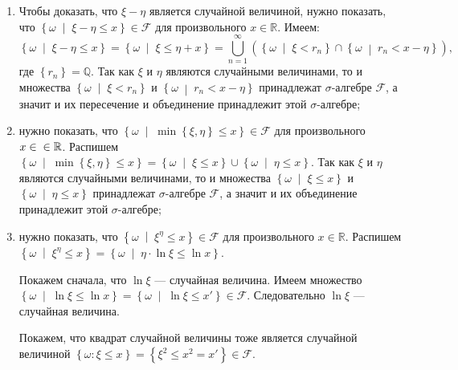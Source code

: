 \begin{enumerate}[label=\alph*)]
\item
Чтобы доказать, что $ \xi - \eta $ является случайной величиной,
нужно показать, что $ \left\{ \omega \; \middle| \; \xi - \eta \leq x \right\} \in \mathcal{F} $ для произвольного $x \in \mathbb{R} $.
Имеем:
$$ \left\{ \omega \; \middle| \; \xi - \eta \leq x \right\} =
\left\{ \omega \; \middle| \; \xi \leq \eta + x \right\} =
\bigcup \limits_{n=1}^{ \infty } \left( \left\{ \omega \; \middle| \; \xi < r_n \right\} \cap
\left\{ \omega \; \middle| \; r_n < x - \eta \right\} \right),$$
где $ \left\{ r_n \right\} = \mathbb{Q} $.
Так как $ \xi $ и $ \eta $ являются случайными величинами,
то и множества
$ \left\{ \omega \; \middle| \; \xi < r_n \right\} $
и $ \left\{ \omega \; \middle| \; r_n < x - \eta \right\} $ принадлежат $ \sigma $-алгебре $ \mathcal{F} $,
а значит и их пересечение и объединение принадлежит этой $ \sigma $-алгебре;
\item нужно показать, что $ \left\{ \omega \; \middle| \; \min \left\{ \xi, \eta \right\} \leq x \right\} \in \mathcal{F} $ для произвольного $x \in \\
\in \mathbb{R} $.
Распишем
$ \left\{ \omega \; \middle| \; \min \left\{ \xi, \eta \right\} \leq x \right\} =
\left\{ \omega \; \middle| \; \xi \leq x \right\} \cup \left\{ \omega \; \middle| \; \eta \leq x \right\} $.
Так как $ \xi $ и $ \eta $ являются случайными величинами,
то и множества $ \left\{ \omega \; \middle| \; \xi \leq x \right\} $ и $ \left\{ \omega \; \middle| \; \eta \leq x \right\} $ принадлежат $ \sigma $-алгебре $ \mathcal{F} $, а значит и их объединение принадлежит этой $ \sigma $-алгебре;
\item нужно показать, что $ \left\{ \omega \; \middle| \; \xi^{ \eta } \leq x \right\} \in \mathcal{F} $ для произвольного $x \in \mathbb{R} $.
Распишем $ \left\{ \omega \; \middle| \; \xi^{ \eta } \leq x \right\} = \left\{ \omega \; \middle| \; \eta \cdot \ln \xi \leq \ln x \right\} $.

Покажем сначала, что $ \ln \xi $ --- случайная величина.
Имеем множество
$ \left\{ \omega \; \middle| \; \ln \xi \leq \ln x \right\} =
\left\{ \omega \; \middle| \; \ln \xi \leq x' \right\} \in
\mathcal{F} $.
Следовательно $ \ln \xi $ --- случайная величина.

Покажем, что квадрат случайной величины тоже является случайной величиной
$ \left\{ \omega: \xi \leq x \right\} =
\left\{ \xi^2 \leq x^2 = x' \right\} \in
\mathcal{F} $.


\end{enumerate}
